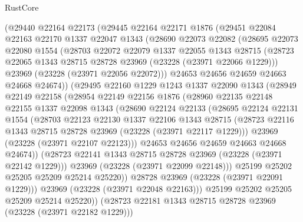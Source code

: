 \begin{lexlean}{RustCore}
\begin{coremodule}
    (@29440
      @22164
      @22173
      (@29445
        @22164
        @22171
        @1876
        (@29451
          @22084
          @22163
          @22170
          @1337
          @22047
          @1343
          (@28690
            @22073
            @22082
            (@28695
              @22073
              @22080
              @1554
              (@28703
                @22072
                @22079
                @1337
                @22055
                @1343
                @28715
                (@28723 @22065 @1343 @28715 @28728 @23969 (@23228 (@23971 @22066 @1229)))
                @23969
                (@23228 (@23971 @22056 @22072)))
              @24653
              @24656
              @24659
              @24663
              @24668
              @24674))
          (@29495
            @22160
            @1229
            @1243
            @1337
            @22090
            @1343
            (@28949
              @22149
              @22158
              (@28954
                @22149
                @22156
                @1876
                (@28960
                  @22135
                  @22148
                  @22155
                  @1337
                  @22098
                  @1343
                  (@28690
                    @22124
                    @22133
                    (@28695
                      @22124
                      @22131
                      @1554
                      (@28703
                        @22123
                        @22130
                        @1337
                        @22106
                        @1343
                        @28715
                        (@28723 @22116 @1343 @28715 @28728 @23969 (@23228 (@23971 @22117 @1229)))
                        @23969
                        (@23228 (@23971 @22107 @22123)))
                      @24653
                      @24656
                      @24659
                      @24663
                      @24668
                      @24674))
                  (@28723 @22141 @1343 @28715 @28728 @23969 (@23228 (@23971 @22142 @1229)))
                  @23969
                  (@23228 (@23971 @22099 @22148)))
                @25199
                @25202
                @25205
                @25209
                @25214
                @25220))
            @28728
            @23969
            (@23228 (@23971 @22091 @1229)))
          @23969
          (@23228 (@23971 @22048 @22163)))
        @25199
        @25202
        @25205
        @25209
        @25214
        @25220))
    (@28723 @22181 @1343 @28715 @28728 @23969 (@23228 (@23971 @22182 @1229)))

\end{coremodule}
\end{lexlean}
